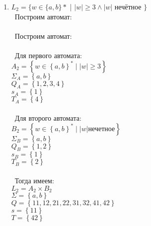 \documentclass{article}
\begin{document}
\begin{enumerate}
{	31 -> 32 [label = "b"];
	31 -> 31 [label = "a"];
	32 -> 33 [label = "b"];
	32 -> 32 [label = "a"];
	33 -> 33 [label = "b"];
}
\\
\item {$L_2 = \{ w \in \{a,b\}*$ | $  {|w|} \ge 3 \wedge {|w|} $ нечётное $ \} $}\\
\ Построим автомат: \\
\\
\ Построим автомат: \\
\\
\ Для первого автомата: \\
$ A_{2} = \left\{ w \in \left\{ a, b \right\}^{*} \mid \left| w \right| \geq 3 \right\} $ \\
$ \Sigma_{A} = \left\{ a, b \right\}$ \\
$ Q_{A} = \left\{ 1, 2, 3, 4 \right\} $ \\
$ s_{A} = \left\{ 1 \right\} $ \\
$ T_{A} = \left\{ 4 \right\}$ \\
\\
\ Для второго автомата: \\
$ B_{2} = \left\{ w \in \left\{ a, b \right\}^{*} \mid  \left| w \right| \text{нечетное} \right\} $ \\
$ \Sigma_{B} = \left\{ a, b \right\}$ \\
$ Q_{B} = \left\{ 1, 2 \right\} $ \\
$ s_{B} = \left\{ 1 \right\} $ \\
$ T_{B} = \left\{ 2 \right\}$ \\
\\
\ Тогда имеем: \\
$L_{2} = A_{2} \times B_{2}$ \\
$ \Sigma = \left\{ a, b \right\}$ \\
$ Q = \left\{ 11, 12, 21, 22, 31, 32, 41, 42 \right\}$ \\
$ s = \left\{ 11 \right\}$ \\
$ T = \left\{ 42 \right\}$ \\
\\ \\ \\

\end{enumerate}
\end{document}
